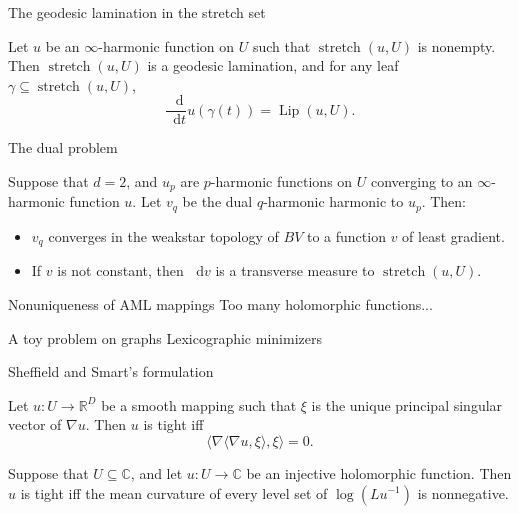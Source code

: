 \documentclass[10pt]{beamer}
\newcommand{\RR}{\mathbb{R}}
\newcommand{\CC}{\mathbb{C}}
\newcommand*\dif{\mathop{}\!\mathrm{d}}
\DeclareMathOperator{\Lip}{Lip}
\DeclareMathOperator{\Stretch}{stretch}
\begin{document}
\begin{frame}{The geodesic lamination in the stretch set}
\begin{theorem}
Let $u$ be an $\infty$-harmonic function on $U$ such that $\Stretch(u, U)$ is nonempty.
Then $\Stretch(u, U)$ is a geodesic lamination, and for any leaf $\gamma \subseteq \Stretch(u, U)$,
$$\frac{\dif}{\dif t} u(\gamma(t)) = \Lip(u, U).$$
\end{theorem}
\end{frame}

\begin{frame}{The dual problem}
\begin{theorem}
Suppose that $d = 2$, and $u_p$ are $p$-harmonic functions on $U$ converging to an $\infty$-harmonic function $u$.
Let $v_q$ be the dual $q$-harmonic harmonic to $u_p$.
Then:
\begin{itemize}
\item $v_q$ converges in the weakstar topology of $BV$ to a function $v$ of least gradient.
\item If $v$ is not constant, then $\dif v$ is a transverse measure to $\Stretch(u, U)$.
\end{itemize}
\end{theorem}
\end{frame}

\begin{frame}{Nonuniqueness of AML mappings}
    Too many holomorphic functions...
\end{frame}

\begin{frame}{A toy problem on graphs}
    Lexicographic minimizers
\end{frame}

\begin{frame}{Sheffield and Smart's formulation}
\begin{theorem}
Let $u: U \to \RR^D$ be a smooth mapping such that $\xi$ is the unique principal singular vector of $\nabla u$.
Then $u$ is tight iff 
$$\langle \nabla \langle \nabla u, \xi\rangle, \xi\rangle = 0.$$
\end{theorem}

\begin{theorem}
Suppose that $U \subseteq \CC$, and let $u: U \to \CC$ be an injective holomorphic function.
Then $u$ is tight iff the mean curvature of every level set of $\log(Lu^{-1})$ is nonnegative.
\end{theorem}
    
\end{frame}
\end{document}
